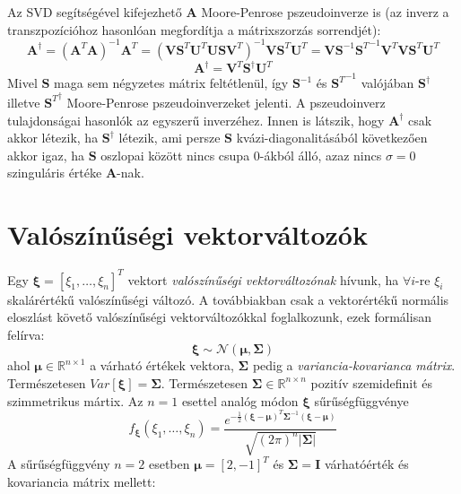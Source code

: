 \documentclass[14p]{report}
\def\pmb{\boldsymbol}
\begin{document}
	\\
	\\
	Az SVD segítségével kifejezhető $\pmb{A}$ Moore-Penrose pszeudoinverze is (az inverz a transzpozícióhoz hasonlóan megfordítja a mátrixszorzás sorrendjét):
	\[
		\pmb{A}^{\dagger} = (\pmb{A}^T\pmb{A})^{-1}\pmb{A}^T = (\pmb{V}\pmb{S}^T\pmb{U}^T\pmb{U}\pmb{S}\pmb{V}^T)^{-1}\pmb{V}\pmb{S}^T\pmb{U}^T = \pmb{V}\pmb{S}^{-1}{\pmb{S}^T}^{-1}\pmb{V}^T\pmb{V}\pmb{S}^T\pmb{U}^T
	\]
	\[
		\pmb{A}^{\dagger} = \pmb{V}^T\pmb{S}^{\dagger}\pmb{U}^T
	\]
	Mivel $\pmb{S}$ maga sem négyzetes mátrix feltétlenül, így $\pmb{S}^{-1}$ és ${\pmb{S}^T}^{-1}$ valójában $\pmb{S}^{\dagger}$ illetve ${\pmb{S}^T}^{\dagger}$ Moore-Penrose pszeudoinverzeket jelenti. A pszeudoinverz tulajdonságai hasonlók az egyszerű inverzéhez.
	Innen is látszik, hogy $\pmb{A}^{\dagger}$ csak akkor létezik, ha $\pmb{S}^{\dagger}$ létezik, ami persze $\pmb{S}$ kvázi-diagonalitásából következően akkor igaz, ha $\pmb{S}$ oszlopai között nincs csupa $0$-ákból álló, azaz nincs $\sigma = 0$ szinguláris értéke $\pmb{A}$-nak.
	
	\section{Valószínűségi vektorváltozók}
	Egy $\pmb{\xi} = [\xi_1, \dots , \xi_n]^T$ vektort \emph{valószínűségi vektorváltozónak} hívunk, ha $\forall i$-re $\xi_i$ skalárértékű valószínűségi változó. A továbbiakban csak a vektorértékű normális eloszlást követő valószínűségi vektorváltozókkal foglalkozunk, ezek formálisan felírva:
	\[
	\pmb{\xi} \sim \mathcal{N}(\pmb{\mu}, \pmb{\Sigma})
	\]
	ahol $\pmb{\mu} \in \mathbb{R}^{n \times 1}$ a várható értékek vektora, $\pmb{\Sigma}$ pedig a \emph{variancia-kovarianca mátrix}. Természetesen $Var[\pmb{\xi}] = \pmb{\Sigma}$. Természetesen $\pmb{\Sigma} \in \mathbb{R}^{n \times n}$ pozitív szemidefinit és szimmetrikus mártix. Az $n = 1$ esettel analóg módon $\pmb{\xi}$ sűrűségfüggvénye
	\[
	f_{\pmb{\xi}}(\xi_1, \dots, \xi_n) = \frac{ e^{-\frac{1}{2}(\pmb{\xi}-\pmb{\mu})^T\pmb{\Sigma}^{-1}(\pmb{\xi}-\pmb{\mu})}}{\sqrt{(2\pi)^n|\pmb{\Sigma}|}}
	\]
	A sűrűségfüggvény $n = 2$ esetben $\pmb{\mu} = [2, -1]^T$ és $\pmb{\Sigma} = \pmb{I}$ várhatóérték és kovariancia mátrix mellett: 
	\def\centerx{2}
	\def\centery{-1}
	
\end{document}

